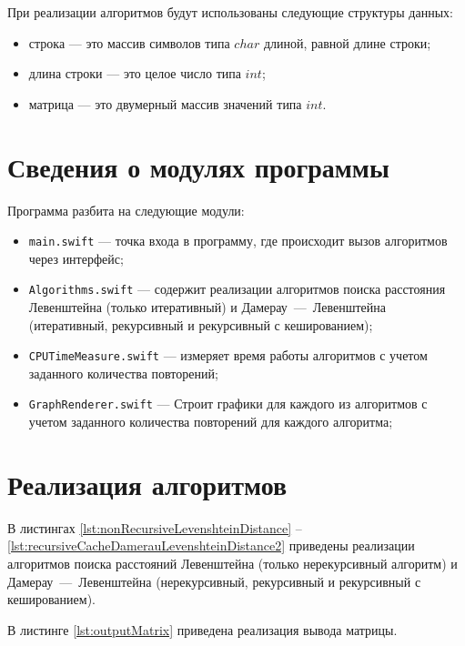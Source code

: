 При реализации алгоритмов будут использованы следующие структуры данных:

\begin{itemize}
	\item строка --- это массив символов типа $char$ длиной, равной длине строки;
	\item длина строки --- это целое число типа $int$;
	\item матрица --- это двумерный массив значений типа $int$.
\end{itemize}


\section{Сведения о модулях программы}

Программа разбита на следующие модули:

\begin{itemize}
	\item \texttt{main.swift} --- точка входа в программу, где происходит вызов алгоритмов через интерфейс;
	\item \texttt{Algorithms.swift} --- содержит реализации алгоритмов поиска расстояния Левенштейна (только итеративный) и Дамерау~---~Левенштейна (итеративный, рекурсивный и рекурсивный с кешированием);
	\item \texttt{CPUTimeMeasure.swift} --- измеряет время работы алгоритмов с учетом заданного количества повторений;
	\item \texttt{GraphRenderer.swift} --- Строит графики для каждого из алгоритмов с учетом заданного количества повторений для каждого алгоритма;
\end{itemize}

\section{Реализация алгоритмов}

В листингах \ref{lst:nonRecursiveLevenshteinDistance} -- \ref{lst:recursiveCacheDamerauLevenshteinDistance2} приведены реализации алгоритмов поиска расстояний Левенштейна (только нерекурсивный алгоритм) и Дамерау~---~Левенштейна (нерекурсивный, рекурсивный и рекурсивный с кешированием).

В листинге \ref{lst:outputMatrix} приведена реализация вывода матрицы.

